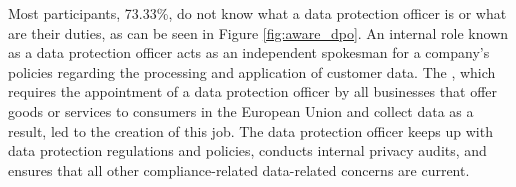 


Most participants, 73.33\%, do not know what a data protection officer is
or what are their duties, as can be seen in Figure \ref{fig:aware_dpo}.
An internal role known as a data protection officer acts as an independent
spokesman for a company's policies regarding the processing and
application of customer data. The \hyperlink{\acronym}{\acronym}, which requires the appointment
of a data protection officer by all businesses that offer goods or
services to consumers in the European Union and collect data as a
result, led to the creation of this job. The data protection officer
keeps up with data protection regulations and policies, conducts
internal privacy audits, and ensures that all other compliance-related
data-related concerns are current.

